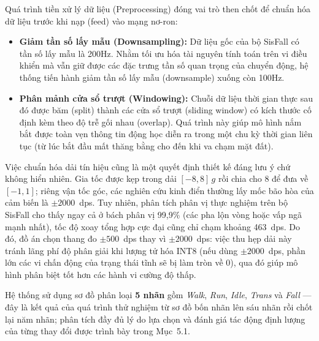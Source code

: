 \documentclass[../DoAn.tex]{subfiles}
\begin{document}
Quá trình tiền xử lý dữ liệu (Preprocessing) đóng vai trò then chốt để chuẩn hóa dữ liệu trước khi nạp (feed) vào mạng nơ-ron:
\begin{itemize}
    \item \textbf{Giảm tần số lấy mẫu (Downsampling):} Dữ liệu gốc của bộ SisFall có tần số lấy mẫu là 200Hz. Nhằm tối ưu hóa tài nguyên tính toán trên vi điều khiển mà vẫn giữ được các đặc trưng tần số quan trọng của chuyển động, hệ thống tiến hành giảm tần số lấy mẫu (downsample) xuống còn 100Hz.
    \item \textbf{Phân mảnh cửa sổ trượt (Windowing):} Chuỗi dữ liệu thời gian thực sau đó được băm (split) thành các cửa sổ trượt (sliding window) có kích thước cố định kèm theo độ trễ gối nhau (overlap). Quá trình này giúp mô hình nắm bắt được toàn vẹn thông tin động học diễn ra trong một chu kỳ thời gian liên tục (từ lúc bắt đầu mất thăng bằng cho đến khi va chạm mặt đất).
\end{itemize}

Việc chuẩn hóa dải tín hiệu cũng là một quyết định thiết kế đáng lưu ý chứ không hiển nhiên. Gia tốc được kẹp trong dải $[-8, 8]\,g$ rồi chia cho 8 để đưa về $[-1, 1]$; riêng vận tốc góc, các nghiên cứu kinh điển thường lấy mốc bão hòa của cảm biến là $\pm 2000$~dps. Tuy nhiên, phân tích phân vị thực nghiệm trên bộ SisFall cho thấy ngay cả ở bách phân vị 99,9\% (các pha lộn vòng hoặc vấp ngã mạnh nhất), tốc độ xoay tổng hợp cực đại cũng chỉ chạm khoảng 463~dps. Do đó, đồ án chọn thang đo $\pm 500$~dps thay vì $\pm 2000$~dps: việc thu hẹp dải này tránh lãng phí độ phân giải khi lượng tử hóa INT8 (nếu dùng $\pm 2000$~dps, phần lớn các vi chấn động của trạng thái tĩnh sẽ bị làm tròn về 0), qua đó giúp mô hình phân biệt tốt hơn các hành vi cường độ thấp.

Hệ thống sử dụng sơ đồ phân loại \textbf{5 nhãn} gồm \textit{Walk}, \textit{Run}, \textit{Idle}, \textit{Trans} và \textit{Fall} --- đây là kết quả của quá trình thử nghiệm từ sơ đồ bốn nhãn lên sáu nhãn rồi chốt lại năm nhãn; phân tích đầy đủ lý do lựa chọn và đánh giá tác động định lượng của từng thay đổi được trình bày trong Mục~5.1.
\end{document}

